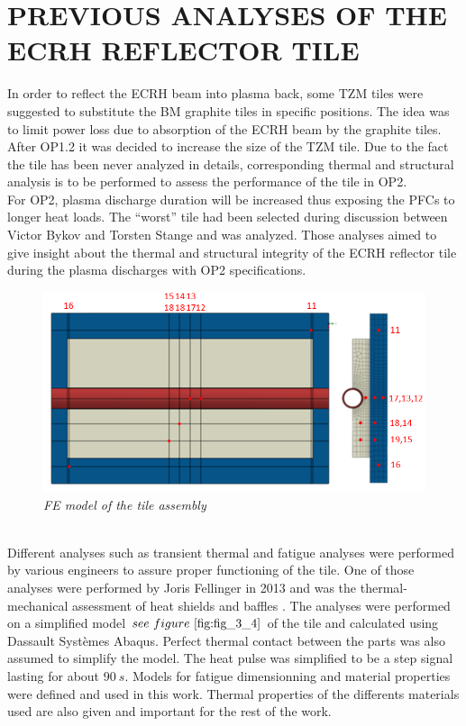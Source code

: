 \section{PREVIOUS ANALYSES OF THE ECRH REFLECTOR TILE}
\normalsize{In order to reflect the \acrshort{ECRH} beam into plasma back, some \acrshort{TZM} tiles were suggested to substitute the \acrshort{BM} graphite tiles in specific positions. The idea was to limit power loss due to absorption of the \acrshort{ECRH} beam by the graphite tiles. After \acrshort{OP1}.2 it was decided to increase the size of the \acrshort{TZM} tile. Due to the fact the tile has been never analyzed in details, corresponding thermal and structural analysis is to be performed to assess the performance of the tile in \acrshort{OP2}.}
\\
\break
\normalsize{\indent For \acrshort{OP2}, plasma discharge duration will be increased thus exposing the \acrshort{PFCs} to longer heat loads. The “worst” tile had been selected during discussion between Victor Bykov and Torsten Stange and was analyzed. Those analyses aimed to give insight about the thermal and structural integrity of the \acrshort{ECRH} reflector tile during the plasma discharges with \acrshort{OP2} specifications.}
\\
\begin{figure}[h!]
    \centering
    \includegraphics[width=.85\textwidth]{figures/JFellingerFEModel2.png}
    \caption{\it FE model of the tile assembly \cite{Fellinger_2013}}
    \label{fig:fig_3_4}
\end{figure}
\\
\break
\normalsize{\indent Different analyses such as transient thermal and fatigue analyses were performed by various engineers to assure proper functioning of the tile. One of those analyses were performed by Joris Fellinger in 2013 and was the thermal-mechanical assessment of heat shields and baffles \cites{Fellinger_2013}. The analyses were performed on a simplified model $see \ figure \ \ref{fig:fig_3_4}$ of the tile and calculated using Dassault Systèmes Abaqus. Perfect thermal contact between the parts was also assumed to simplify the model. The heat pulse was simplified to be a step signal lasting for about $90 \ s$. Models for fatigue dimensionning and material properties were defined and used in this work. Thermal properties of the differents materials used are also given and important for the rest of the work.}
